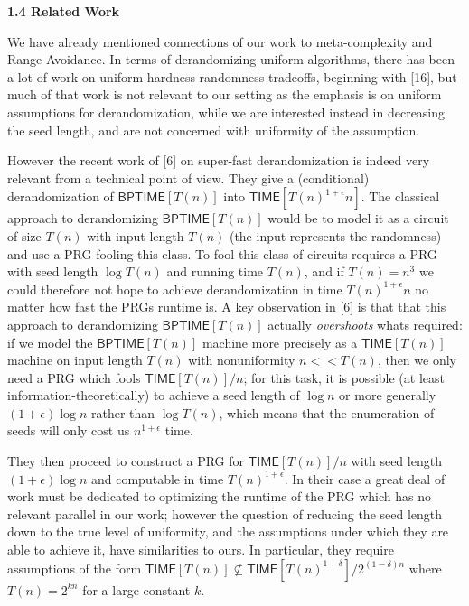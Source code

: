 \par\medskip\noindent\textbf{
1.4 Related Work}\par




We have already mentioned connections of our work to meta-complexity and Range Avoidance. In terms of derandomizing uniform algorithms, there has been a lot of work on uniform hardness-randomness tradeoffs, beginning with [16], but much of that work is not relevant to our setting as the emphasis is on uniform assumptions for derandomization, while we are interested instead in decreasing the seed length, and are not concerned with uniformity of the assumption.\par




However the recent work of [6] on super-fast derandomization is indeed very relevant from a technical point of view.
They give a (conditional) derandomization of ${\mathsf{BPTIME}}[T(n)]$ into ${\mathsf{TIME}}[T(n)^{1+\epsilon}n]$. The classical approach to derandomizing ${\mathsf{BPTIME}}[T(n)]$ would be to model it as a circuit of size $T(n)$ with input length $T(n)$ (the input represents the randomness) and use a PRG fooling this class. To fool this class of circuits requires a PRG with seed length $\log T(n)$ and running time $T(n)$, and if $T(n)=n^{3}$ we could therefore not hope to achieve derandomization in time $T(n)^{1+\epsilon}n$ no matter how fast the PRGs runtime is. A key observation in [6] is that that this approach to derandomizing ${\mathsf{BPTIME}}[T(n)]$ actually \emph{overshoots} whats required: if we model the ${\mathsf{BPTIME}}[T(n)]$ machine more precisely as a ${\mathsf{TIME}}[T(n)]$ machine on input length $T(n)$ with nonuniformity $n<<T(n)$, then we only need a PRG which fools ${\mathsf{TIME}}[T(n)]/n$; for this task, it is possible (at least information-theoretically) to achieve a seed length of $\log n$ or more generally $(1+\epsilon)\log n$ rather than $\log T(n)$, which means that the enumeration of seeds will only cost us $n^{1+\epsilon}$ time.\par




They then proceed to construct a PRG for ${\mathsf{TIME}}[T(n)]/n$ with seed length $(1+\epsilon)\log n$ and computable in time $T(n)^{1+\epsilon}$. In their case a great deal of work must be dedicated to optimizing the runtime of the PRG which has no relevant parallel in our work; however the question of reducing the seed length down to the true level of uniformity, and the assumptions under which they are able to achieve it, have similarities to ours. In particular, they require assumptions of the form ${\mathsf{TIME}}[T(n)]\not\subseteq{\mathsf{TIME}}[T(n)^{1-\delta}]/2^{(1-\delta)n}$ where $T(n)=2^{kn}$ for a large constant $k$.\par




